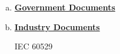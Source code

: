 \begin{enumerate}[(a)]
	\item \textbf{\underline{Government Documents}}
	\item \textbf{\underline{Industry Documents}}
		
		IEC 60529	
	
\end{enumerate}

%
%
%
